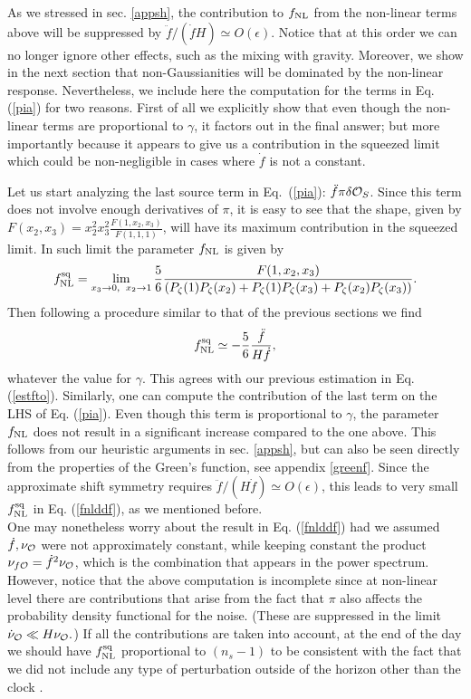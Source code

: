\documentclass[11pt,amsmath,floats,floatfix,nofootinbib,secnumarabic, superscriptaddress, tightenlines]{revtex4}
\newcommand{\beq}{\begin{equation}}
\newcommand{\eeq}{\end{equation}}
\newcommand{\calo}{{\cal O}}
\begin{document}
{ As we stressed in sec. \ref{appsh}, the contribution to $f_{\rm NL}$ from the non-linear terms above will be suppressed by $\ddot f/(\dot f H) \simeq O(\epsilon)$. Notice that at this order we can no longer ignore other effects, such as the mixing with gravity. Moreover, we show in the next section that non-Gaussianities will be dominated by the non-linear response. Nevertheless, we include here the computation for the terms in Eq. (\ref{pia}) for two reasons. First of all we explicitly show that even though the non-linear terms are proportional to $\gamma$, it factors out in the final answer; but more importantly because it appears to give us a contribution in the squeezed limit which could be non-negligible in cases where $\dot f$ is not a constant.

Let us start analyzing the last source term in Eq.~(\ref{pia}): $\ddot{f}\pi\delta \calo_S$. Since this term does not involve enough derivatives of $\pi$, it
 is easy to see that the shape, given by $F(x_2,x_3)=x_2^2x_3^2 \frac{F(1,x_2,x_3)}{F(1,1,1)}$, will have its maximum contribution in the squeezed limit. In  such limit the parameter $f_{\rm NL}$ is given by
\begin{equation}\label{squ}
f_{\rm NL}^{\rm sq} =\lim_{x_3\to 0,\,\ x_2\to 1}\frac{5}{6} \frac{F(1,x_2,x_3)}{(P_{\zeta}(1)P_{\zeta}(x_2)+P_{\zeta}(1)P_{\zeta}(x_3)+P_{\zeta}(x_2)P_{\zeta}(x_3))}.
\end{equation}
Then following a procedure similar to that of the previous sections we find \beq f_{\rm NL}^{\rm sq}\simeq-\frac{5 }{6}\frac{\ddot{f}}{H\dot{f}} \label{fnlddf},\eeq
whatever the value for $\gamma$. This agrees with our previous estimation in Eq. (\ref{estfto}). Similarly, one can compute the contribution of the last term on the LHS of Eq. (\ref{pia}). Even though this term is proportional to $\gamma$, the parameter $f_{\rm NL}$ does not result in a significant increase compared to the one above. This follows from our heuristic arguments in sec. \ref{appsh}, but can also be seen directly from the properties of the Green's function, see appendix \ref{greenf}. Since the approximate shift symmetry requires $\ddot{f}/(H\dot{f})\simeq O(\epsilon)$, this leads to very small $f_{\rm NL}^{\rm sq}$ in Eq. (\ref{fnlddf}), as we mentioned before.\\

One may nonetheless worry about the result in Eq. (\ref{fnlddf})
had we assumed $\dot f, \nu_{\calo}$ were not approximately constant, while keeping constant the product $\nu_{f\calo}=\dot f^2\nu_{\calo}$, which is the combination that appears in the power spectrum. However, notice that the above computation is incomplete since at non-linear level there are contributions that arise from the fact that  $\pi$ also affects the probability density functional for the noise. (These are suppressed in the limit $\dot\nu_{\calo} \ll H\nu_{\calo}.$) If all the contributions are taken into account, at the end of the day we should have $f_{\rm NL}^{\rm sq}$ proportional to $(n_s-1)$ to be consistent with the fact that we did not include any type of perturbation outside of the horizon other than the clock \cite{consist,Cheung:2007sv}. 

}
\end{document}
